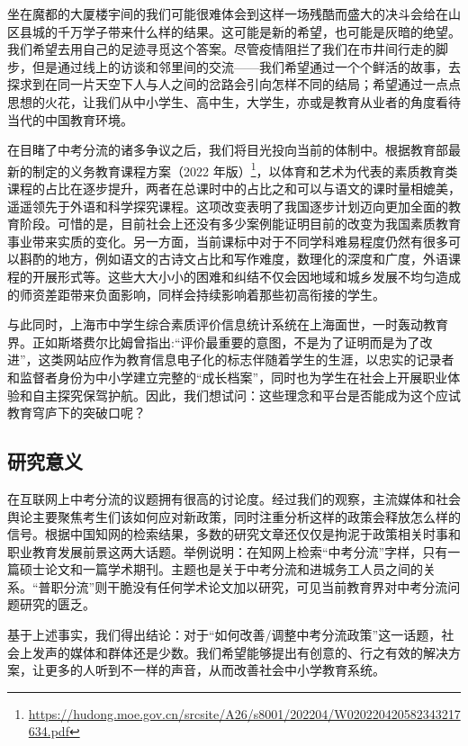 \documentclass[12pt,UTF8]{ctexart}
\begin{document}
\par{坐在魔都的大厦楼宇间的我们可能很难体会到这样一场残酷而盛大的决斗会给在山区县城的千万学子带来什么样的结果。这可能是新的希望，也可能是灰暗的绝望。我们希望去用自己的足迹寻觅这个答案。尽管疫情阻拦了我们在市井间行走的脚步，但是通过线上的访谈和邻里间的交流——我们希望通过一个个鲜活的故事，去探求到在同一片天空下人与人之间的岔路会引向怎样不同的结局；希望通过一点点思想的火花，让我们从中小学生、高中生，大学生，亦或是教育从业者的角度看待当代的中国教育环境。}

\par{在目睹了中考分流的诸多争议之后，我们将目光投向当前的体制中。根据教育部最新的制定的义务教育课程方案（2022
	年版）\footnote{\url{https://hudong.moe.gov.cn/srcsite/A26/s8001/202204/W020220420582343217634.pdf}}，以体育和艺术为代表的素质教育类课程的占比在逐步提升，两者在总课时中的占比之和可以与语文的课时量相媲美，遥遥领先于外语和科学探究课程。这项改变表明了我国逐步计划迈向更加全面的教育阶段。可惜的是，目前社会上还没有多少案例能证明目前的改变为我国素质教育事业带来实质的变化。另一方面，当前课标中对于不同学科难易程度仍然有很多可以斟酌的地方，例如语文的古诗文占比和写作难度，数理化的深度和广度，外语课程的开展形式等。这些大大小小的困难和纠结不仅会因地域和城乡发展不均匀造成的师资差距带来负面影响，同样会持续影响着那些初高衔接的学生。}

\par{与此同时，上海市中学生综合素质评价信息统计系统在上海面世，一时轰动教育界。正如斯塔费尔比姆曾指出:“评价最重要的意图，不是为了证明而是为了改进”，这类网站应作为教育信息电子化的标志伴随着学生的生涯，以忠实的记录者和监督者身份为中小学建立完整的“成长档案”，同时也为学生在社会上开展职业体验和自主探究保驾护航。因此，我们想试问：这些理念和平台是否能成为这个应试教育穹庐下的突破口呢？}

\subsection {研究意义}
\par{在互联网上中考分流的议题拥有很高的讨论度。经过我们的观察，主流媒体和社会舆论主要聚焦考生们该如何应对新政策，同时注重分析这样的政策会释放怎么样的信号。根据中国知网的检索结果，多数的研究文章还仅仅是拘泥于政策相关时事和职业教育发展前景这两大话题。举例说明：在知网上检索“中考分流”字样，只有一篇硕士论文和一篇学术期刊。主题也是关于中考分流和进城务工人员之间的关系。“普职分流”则干脆没有任何学术论文加以研究，可见当前教育界对中考分流问题研究的匮乏。}

\par{基于上述事实，我们得出结论：对于“如何改善/调整中考分流政策”这一话题，社会上发声的媒体和群体还是少数。我们希望能够提出有创意的、行之有效的解决方案，让更多的人听到不一样的声音，从而改善社会中小学教育系统。}
\end{document}
